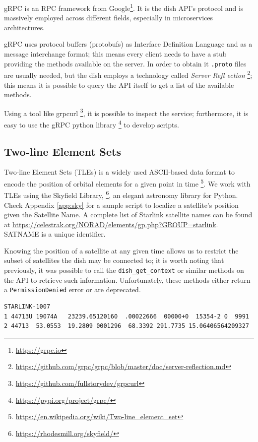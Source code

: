 \documentclass[IN,11pt,twoside,openright,idp,english]{tumthesis}
\begin{document}
gRPC is an RPC framework from Google\footnote{\url{https://grpc.io}}. It is the dish API's protocol and is massively employed across different fields, especially in microservices architectures. 
    
gRPC uses protocol buffers (protobufs) as Interface Definition Language and as a message interchange format; this means every client needs to have a stub providing the methods available on the server. In order to obtain it \texttt{.proto} files are usually needed, but the dish employs a technology called \textit{Server Refl   ection} \footnote{\url{https://github.com/grpc/grpc/blob/master/doc/server-reflection.md}}; this means it is possible to query the API itself to get a list of the available methods.

Using a tool like grpcurl \footnote{\url{https://github.com/fullstorydev/grpcurl}}, it is possible to inspect the service; furthermore, it is easy to use the gRPC python library \footnote{\url{https://pypi.org/project/grpc/}} to develop scripts.
    
\subsection{Two-line Element Sets}
    
Two-line Element Sets (TLEs) is a widely used ASCII-based data format to encode the position of orbital elements for a given point in time \footnote{\url{https://en.wikipedia.org/wiki/Two-line_element_set}}. We work with TLEs using the Skyfield Library, \footnote{\url{https://rhodesmill.org/skyfield/}}, an elegant astronomy library for Python. Check Appendix \ref{app:sky} for a sample script to localize a satellite's position given the Satellite Name. A complete list of Starlink satellite names can be found at \url{https://celestrak.org/NORAD/elements/gp.php?GROUP=starlink}. 
SATNAME is a unique identifier.
    
Knowing the position of a satellite at any given time allows us to restrict the subset of satellites the dish may be connected to; it is worth noting that previously, it was possible to call the \texttt{dish\_get\_context} or similar methods on the API to retrieve such information. Unfortunately, these methods either return a \texttt{PermissionDenied} error or are deprecated.
    
\begin{lstlisting}[caption={TLE for satellite STARLINK-1007 },captionpos=b]
STARLINK-1007           
1 44713U 19074A   23239.65120160  .00022666  00000+0  15354-2 0  9991
2 44713  53.0553  19.2809 0001296  68.3392 291.7735 15.06406564209327
\end{lstlisting}
    
\end{document}
